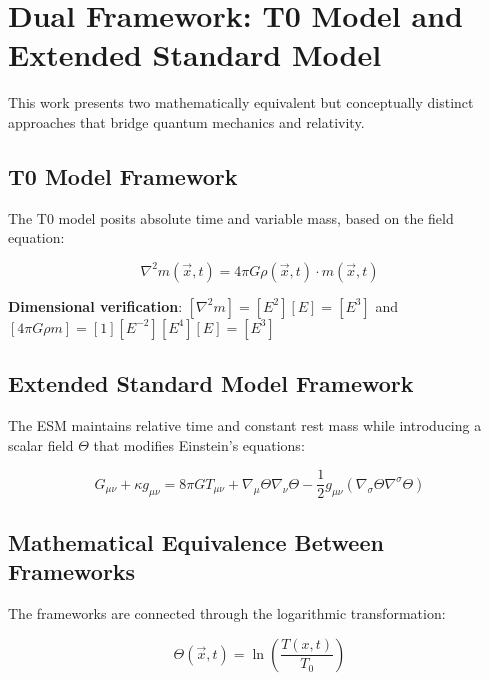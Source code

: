 \documentclass[twocolumn,aps,prl]{revtex4-2}
\newcommand{\Tfieldt}{T(x,t)}
\newcommand{\Tzero}{T_0}
\begin{document}
	\section{Dual Framework: T0 Model and Extended Standard Model}
	\label{sec:dual_framework}
	
	This work presents two mathematically equivalent but conceptually distinct approaches that bridge quantum mechanics and relativity.
	
	\subsection{T0 Model Framework}
	\label{subsec:t0_framework}
	
	The T0 model posits absolute time and variable mass, based on the field equation:
	
	\begin{equation}
		\nabla^2 m(\vec{x},t) = 4\pi G \rho(\vec{x},t) \cdot m(\vec{x},t)
		\label{eq:t0_field_equation}
	\end{equation}
	
	\textbf{Dimensional verification}: \([\nabla^2 m] = [E^2][E] = [E^3]\) and \([4\pi G \rho m] = [1][E^{-2}][E^4][E] = [E^3]\) \checkmark
	
	\subsection{Extended Standard Model Framework}
	\label{subsec:esm_framework}
	
	The ESM maintains relative time and constant rest mass while introducing a scalar field \(\Theta\) that modifies Einstein's equations:
	
	\begin{equation}
		G_{\mu\nu} + \kappa g_{\mu\nu} = 8\pi G T_{\mu\nu} + \nabla_{\mu}\Theta\nabla_{\nu}\Theta - \frac{1}{2}g_{\mu\nu}(\nabla_{\sigma}\Theta\nabla^{\sigma}\Theta)
		\label{eq:modified_einstein}
	\end{equation}
	
	\subsection{Mathematical Equivalence Between Frameworks}
	\label{subsec:mathematical_equivalence}
	
	The frameworks are connected through the logarithmic transformation:
	
	\begin{equation}
		\Theta(\vec{x},t) = \ln\left(\frac{\Tfieldt}{\Tzero}\right)
		\label{eq:theta_transformation}
	\end{equation}
	
\end{document}
